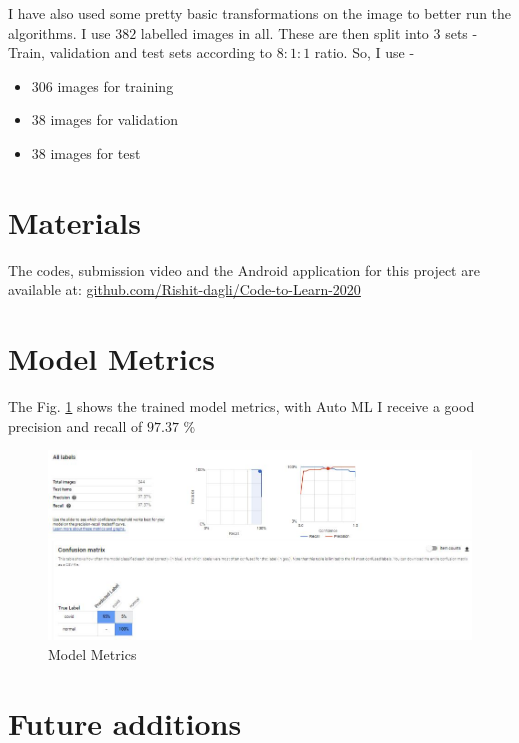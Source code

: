 \documentclass[a4paper]{article}
\begin{document}
\qquad I have also used some pretty basic transformations on the image to better run the algorithms. I use $382$ labelled images in all. These are then split into $3$ sets - Train, validation and test sets according to $8:1:1$ ratio. So, I use -
\begin{itemize}
    \item $306$ images for training
    \item $38$ images for validation
    \item $38$ images for test
\end{itemize}

\section{Materials}

\qquad The codes, submission video and the Android application for this project are available at: \cite{CodeToLearnGH} \href{https://github.com/Rishit-dagli/Code-to-Learn-2020}{github.com/Rishit-dagli/Code-to-Learn-2020}

\section{Model Metrics}

The Fig. \ref{fig:1} shows the trained model metrics, with Auto ML I receive a good precision and recall of $97.37$ \%

\begin{figure}[ht]
  \centering
  \includegraphics[width=\linewidth]{metrics.JPG}
  \caption{Model Metrics}
  \label{fig:1}
\end{figure}

\section{Future additions}
\end{document}
